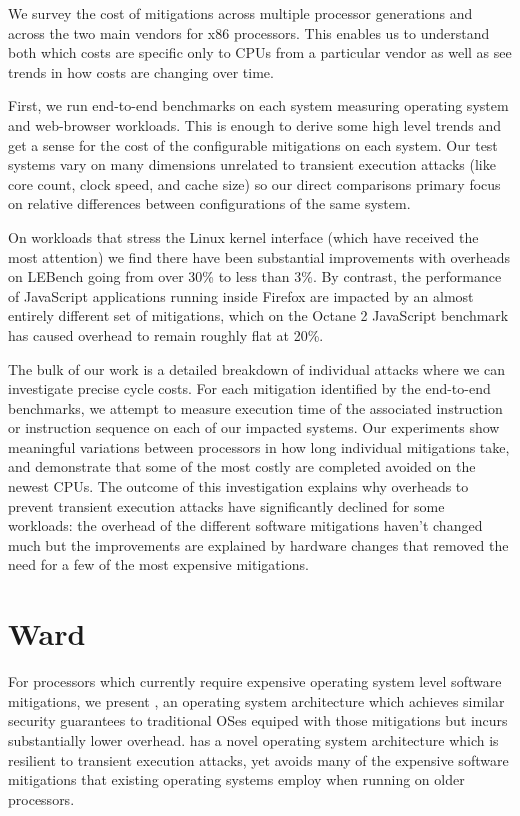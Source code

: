 We survey the cost of mitigations across multiple processor generations and across the two main vendors for x86 processors.
This enables us to understand both which costs are specific only to CPUs from a particular vendor as well as see trends in how costs are changing over time.


First, we run end-to-end benchmarks on each system measuring operating system and web-browser workloads.
This is enough to derive some high level trends and get a sense for the cost of the configurable mitigations on each system.
Our test systems vary on many dimensions unrelated to transient execution attacks (like core count, clock speed, and cache size) so our direct comparisons primary focus on relative differences between configurations of the same system.

On workloads that stress the Linux kernel interface (which have received the most attention) we find there have been substantial improvements with overheads on LEBench going from over 30\% to less than 3\%.
By contrast, the performance of JavaScript applications running inside Firefox are impacted by an almost entirely different set of mitigations, which on the Octane 2 JavaScript benchmark has caused overhead to remain roughly flat at 20\%. 


The bulk of our work is a detailed breakdown of individual attacks where we can investigate precise cycle costs.
For each mitigation identified by the end-to-end benchmarks, we attempt to measure execution time of the associated instruction or instruction sequence on each of our impacted systems.
Our experiments show meaningful variations between processors in how long individual mitigations take, and demonstrate that some of the most costly are completed avoided on the newest CPUs. 
The outcome of this investigation explains why overheads to prevent transient execution attacks have significantly declined for some workloads: the overhead of the different software mitigations haven't changed much but the improvements are explained by hardware changes that removed the need for a few of the most expensive mitigations.

\section{Ward}
For processors which currently require expensive operating system level software mitigations, we present \sys, an operating system architecture which achieves similar security guarantees to traditional OSes equiped with those mitigations but incurs substantially lower overhead.
\sys has a novel operating system architecture which is resilient to transient execution attacks, yet avoids many of the expensive software mitigations that existing operating systems employ when running on older processors. 


